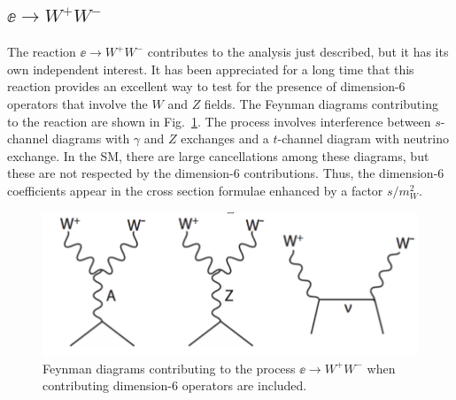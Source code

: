 \subsection{$\ee \to W^+W^-$}
\label{subsec:phys_WW}
The reaction $\ee\to W^+W^-$ contributes to the analysis just described, but it has its own independent interest.  It has been appreciated for  a long time that this reaction provides an excellent way to test for the presence of dimension-6 operators that involve the $W$ and $Z$ fields.   The Feynman diagrams contributing to the reaction are shown in Fig.~\ref{fig:eeWWdiagrams}.   The process involves interference between $s$-channel diagrams with $\gamma$ and $Z$ exchanges and a $t$-channel diagram with neutrino exchange.  In the SM, there are large cancellations among these diagrams, but these are not respected by the dimension-6 contributions.   Thus, the dimension-6 coefficients appear in the cross section formulae enhanced by a factor $s/m_W^2$. 

\begin{figure}
\begin{center}
\includegraphics[width=0.80\hsize]{chapters/figures/WWdiagrams.pdf}
\end{center}
\caption{Feynman diagrams contributing to the process $\ee\to W^+W^-$ when contributing  dimension-6 operators are included.}
\label{fig:eeWWdiagrams}
\end{figure}


